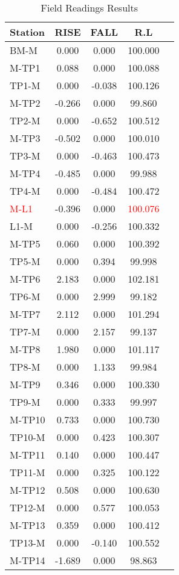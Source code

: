 \documentclass[12pt]{report}
\begin{document}
\begin{longtable}{lcccc}
\caption{Field Readings Results} \label{tab:mylongtable} \\ %

\toprule
Station & RISE & FALL & R.L \\
\midrule
\endhead
\bottomrule
\endfoot
BM-M & 0.000 & 0.000 & 100.000 \\
M-TP1 & 0.088 & 0.000 & 100.088 \\
TP1-M & 0.000 & -0.038 & 100.126 \\
M-TP2 & -0.266 & 0.000 & 99.860 \\
TP2-M & 0.000 & -0.652 & 100.512 \\
M-TP3 & -0.502 & 0.000 & 100.010 \\
TP3-M & 0.000 & -0.463 & 100.473 \\
M-TP4 & -0.485 & 0.000 & 99.988 \\
TP4-M & 0.000 & -0.484 & 100.472 \\
\textcolor{red}{M-L1} & -0.396 & 0.000 & \textcolor{red}{100.076} \\
L1-M & 0.000 & -0.256 & 100.332 \\
M-TP5 & 0.060 & 0.000 & 100.392 \\
TP5-M & 0.000 & 0.394 & 99.998 \\
M-TP6 & 2.183 & 0.000 & 102.181 \\
TP6-M & 0.000 & 2.999 & 99.182 \\
M-TP7 & 2.112 & 0.000 & 101.294 \\
TP7-M & 0.000 & 2.157 & 99.137 \\
M-TP8 & 1.980 & 0.000 & 101.117 \\
TP8-M & 0.000 & 1.133 & 99.984 \\
M-TP9 & 0.346 & 0.000 & 100.330 \\
TP9-M & 0.000 & 0.333 & 99.997 \\
M-TP10 & 0.733 & 0.000 & 100.730 \\
TP10-M & 0.000 & 0.423 & 100.307 \\
M-TP11 & 0.140 & 0.000 & 100.447 \\
TP11-M & 0.000 & 0.325 & 100.122 \\
M-TP12 & 0.508 & 0.000 & 100.630 \\
TP12-M & 0.000 & 0.577 & 100.053 \\
M-TP13 & 0.359 & 0.000 & 100.412 \\
TP13-M & 0.000 & -0.140 & 100.552 \\
M-TP14 & -1.689 & 0.000 & 98.863 \\

\end{longtable}
\end{document}
